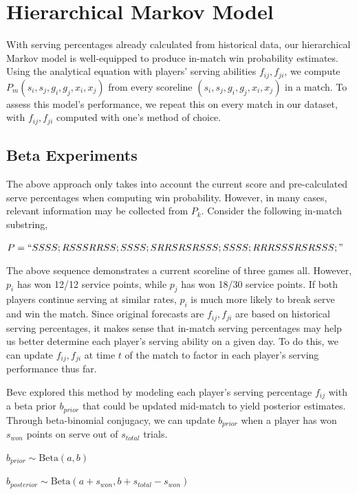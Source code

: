 \documentclass[chapterprefix=false]{report}
\begin{document}
\section{Hierarchical Markov Model}
With serving percentages already calculated from historical data, our hierarchical Markov model is well-equipped to produce in-match win probability estimates. Using the analytical equation with players' serving abilities $f_{ij},f_{ji}$, we compute $P_m(s_i,s_j,g_i,g_j,x_i,x_j)$ from every scoreline $(s_i,s_j,g_i,g_j,x_i,x_j)$ in a match. To assess this model's performance, we repeat this on every match in our dataset, with $f_{ij},f_{ji}$ computed with one's method of choice.

\subsection{Beta Experiments}
The above approach only takes into account the current score and pre-calculated serve percentages when computing win probability. However, in many cases, relevant information may be collected from $P_k$. Consider the following in-match substring, 

$P=``SSSS;RSSSRRSS;SSSS;SRRSRSRSSS;SSSS;RRRSSSRSRSSS;"$

The above sequence demonstrates a current scoreline of three games all. However, $p_i$ has won 12/12 service points, while $p_j$ has won 18/30 service points. If both players continue serving at similar rates, $p_i$ is much more likely to break serve and win the match. Since original forecasts are $f_{ij},f_{ji}$ are based on historical serving percentages, it makes sense that in-match serving percentages may help us better determine each player's serving ability on a given day. To do this, we can update $f_{ij},f_{ji}$ at time $t$ of the match to factor in each player's serving performance thus far.

Bevc explored this method by modeling each player's serving percentage $f_{ij}$ with a beta prior $b_{prior}$ that could be updated mid-match to yield posterior estimates. Through beta-binomial conjugacy, we can update $b_{prior}$ when a player has won $s_{won}$ points on serve out of $s_{total}$ trials.

\begin{center}
$b_{prior} \sim \text{Beta}(a,b)$ 

$b_{posterior} \sim \text{Beta}(a+s_{won},b+s_{total}-s_{won})$
\end{center}

\end{document}
